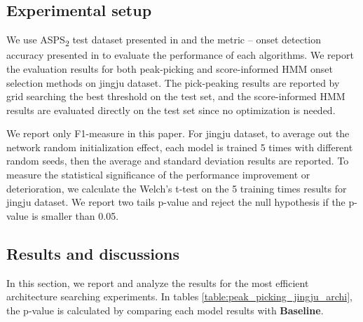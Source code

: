 \subsection{Experimental setup}\label{sec:ch5:eval_improving} 

We use \gls{ASPS}\textsubscript{2} test dataset presented in  and the metric -- onset detection accuracy presented in  to evaluate the performance of each algorithms. We report the evaluation results for both peak-picking and score-informed \gls{HMM} onset selection methods on jingju dataset. The pick-peaking results are reported by grid searching the best threshold on the test set, and the score-informed \gls{HMM} results are evaluated directly on the test set since no optimization is needed.

We report only F1-measure in this paper. 
For jingju dataset, to average out the network random initialization effect, each model is trained 5 times with different random seeds, then the average and standard deviation results are reported. To measure the statistical significance of the performance improvement or deterioration, we calculate the Welch's t-test on the 5 training times results for jingju dataset. We report two tails p-value and reject the null hypothesis if the p-value is smaller than 0.05.

\subsection{Results and discussions}

In this section, we report and analyze the results for the most efficient architecture searching experiments. In tables \ref{table:peak_picking_jingju_archi}, the p-value is calculated by comparing each model results with \textbf{Baseline}.

